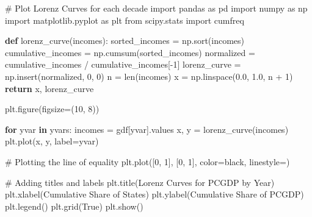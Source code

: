 \documentclass[
  a4paper, 
  twoside,
  final
]{article}
\newenvironment{Shaded}{\begin{snugshade}}{\end{snugshade}}
\newcommand{\BuiltInTok}[1]{\textcolor[rgb]{0.00,0.23,0.31}{#1}}
\newcommand{\CommentTok}[1]{\textcolor[rgb]{0.37,0.37,0.37}{#1}}
\newcommand{\ControlFlowTok}[1]{\textcolor[rgb]{0.00,0.23,0.31}{\textbf{#1}}}
\newcommand{\DecValTok}[1]{\textcolor[rgb]{0.68,0.00,0.00}{#1}}
\newcommand{\FloatTok}[1]{\textcolor[rgb]{0.68,0.00,0.00}{#1}}
\newcommand{\ImportTok}[1]{\textcolor[rgb]{0.00,0.46,0.62}{#1}}
\newcommand{\KeywordTok}[1]{\textcolor[rgb]{0.00,0.23,0.31}{\textbf{#1}}}
\newcommand{\NormalTok}[1]{\textcolor[rgb]{0.00,0.23,0.31}{#1}}
\newcommand{\OperatorTok}[1]{\textcolor[rgb]{0.37,0.37,0.37}{#1}}
\newcommand{\StringTok}[1]{\textcolor[rgb]{0.13,0.47,0.30}{#1}}
\newcommand{\VariableTok}[1]{\textcolor[rgb]{0.07,0.07,0.07}{#1}}
\begin{document}
\begin{Shaded}
\begin{Highlighting}[]
\CommentTok{\# Plot Lorenz Curves for each decade}
\ImportTok{import}\NormalTok{ pandas }\ImportTok{as}\NormalTok{ pd}
\ImportTok{import}\NormalTok{ numpy }\ImportTok{as}\NormalTok{ np}
\ImportTok{import}\NormalTok{ matplotlib.pyplot }\ImportTok{as}\NormalTok{ plt}
\ImportTok{from}\NormalTok{ scipy.stats }\ImportTok{import}\NormalTok{ cumfreq}

\KeywordTok{def}\NormalTok{ lorenz\_curve(incomes):}
\NormalTok{    sorted\_incomes }\OperatorTok{=}\NormalTok{ np.sort(incomes)}
\NormalTok{    cumulative\_incomes }\OperatorTok{=}\NormalTok{ np.cumsum(sorted\_incomes)}
\NormalTok{    normalized }\OperatorTok{=}\NormalTok{ cumulative\_incomes }\OperatorTok{/}\NormalTok{ cumulative\_incomes[}\OperatorTok{{-}}\DecValTok{1}\NormalTok{]}
\NormalTok{    lorenz\_curve }\OperatorTok{=}\NormalTok{ np.insert(normalized, }\DecValTok{0}\NormalTok{, }\DecValTok{0}\NormalTok{)}
\NormalTok{    n }\OperatorTok{=} \BuiltInTok{len}\NormalTok{(incomes)}
\NormalTok{    x }\OperatorTok{=}\NormalTok{ np.linspace(}\FloatTok{0.0}\NormalTok{, }\FloatTok{1.0}\NormalTok{, n }\OperatorTok{+} \DecValTok{1}\NormalTok{)}
    \ControlFlowTok{return}\NormalTok{ x, lorenz\_curve}


\NormalTok{plt.figure(figsize}\OperatorTok{=}\NormalTok{(}\DecValTok{10}\NormalTok{, }\DecValTok{8}\NormalTok{))}

\ControlFlowTok{for}\NormalTok{ yvar }\KeywordTok{in}\NormalTok{ yvars:}
\NormalTok{    incomes }\OperatorTok{=}\NormalTok{ gdf[yvar].values}
\NormalTok{    x, y }\OperatorTok{=}\NormalTok{ lorenz\_curve(incomes)}
\NormalTok{    plt.plot(x, y, label}\OperatorTok{=}\NormalTok{yvar)}

\CommentTok{\# Plotting the line of equality}
\NormalTok{plt.plot([}\DecValTok{0}\NormalTok{, }\DecValTok{1}\NormalTok{], [}\DecValTok{0}\NormalTok{, }\DecValTok{1}\NormalTok{], color}\OperatorTok{=}\StringTok{\textquotesingle{}black\textquotesingle{}}\NormalTok{, linestyle}\OperatorTok{=}\StringTok{\textquotesingle{}{-}{-}\textquotesingle{}}\NormalTok{)}

\CommentTok{\# Adding titles and labels}
\NormalTok{plt.title(}\StringTok{\textquotesingle{}Lorenz Curves for PCGDP by Year\textquotesingle{}}\NormalTok{)}
\NormalTok{plt.xlabel(}\StringTok{\textquotesingle{}Cumulative Share of States\textquotesingle{}}\NormalTok{)}
\NormalTok{plt.ylabel(}\StringTok{\textquotesingle{}Cumulative Share of PCGDP\textquotesingle{}}\NormalTok{)}
\NormalTok{plt.legend()}
\NormalTok{plt.grid(}\VariableTok{True}\NormalTok{)}
\NormalTok{plt.show()}
\end{Highlighting}
\end{Shaded}
\end{document}
